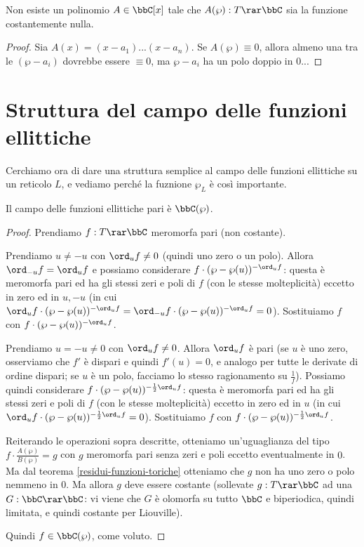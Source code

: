 \begin{teorema}
Non esiste un polinomio $A\in\bbC[x]$ tale che $A(\wp):T\rar\bbC$ sia la funzione costantemente nulla.
\end{teorema}
\begin{proof}
Sia $A(x)=(x-a_1)...(x-a_n)$. Se $A(\wp)\equiv0$, allora almeno una tra le $(\wp-a_i)$ dovrebbe essere $\equiv0$, ma $\wp-a_i$ ha un polo doppio in $0$...
\end{proof}


\section{Struttura del campo delle funzioni ellittiche}
Cerchiamo ora di dare una struttura semplice al campo delle funzioni ellittiche su un reticolo $L$, e vediamo perché la fuznione $\wp_L$ è così importante.

\begin{teorema}
Il campo delle funzioni ellittiche pari è $\bbC(\wp)$.
\end{teorema}
\begin{proof}
Prendiamo $f:T\rar\bbC$ meromorfa pari (non costante).

Prendiamo $u\not=-u$ con $\ord_uf\not=0$ (quindi uno zero o un polo). Allora $\ord_{-u}f=\ord_uf$ e possiamo considerare $f\cdot(\wp-\wp(u))^{-\ord_uf}$:
questa è meromorfa pari ed ha gli stessi zeri e poli di $f$ (con le stesse molteplicità) eccetto
in zero ed in $u,-u$ (in cui $\ord_uf\cdot(\wp-\wp(u))^{-\ord_uf}=\ord_{-u}f\cdot(\wp-\wp(u))^{-\ord_uf}=0$).
Sostituiamo $f$ con $f\cdot(\wp-\wp(u))^{-\ord_uf}$.

Prendiamo $u=-u\not=0$ con $\ord_uf\not=0$. Allora $\ord_uf$ è pari (se $u$ è uno zero, osserviamo che $f'$ è dispari e quindi $f'(u)=0$, e analogo per tutte le derivate di ordine dispari;
se $u$ è un polo, facciamo lo stesso ragionamento su $\frac{1}{f}$). Possiamo quindi considerare $f\cdot(\wp-\wp(u))^{-\frac{1}{2}\ord_uf}$:
questa è meromorfa pari ed ha gli stessi zeri e poli di $f$ (con le stesse molteplicità) eccetto in zero ed in $u$ (in cui $\ord_uf\cdot(\wp-\wp(u))^{-\frac{1}{2}\ord_uf}=0$).
Sostituiamo $f$ con $f\cdot(\wp-\wp(u))^{-\frac{1}{2}\ord_uf}$.

Reiterando le operazioni sopra descritte, otteniamo un'uguaglianza del tipo $f\cdot\frac{A(\wp)}{B(\wp)}=g$ con $g$ meromorfa pari senza zeri e poli eccetto eventualmente in $0$.
Ma dal teorema \ref{residui-funzioni-toriche} otteniamo che $g$ non ha uno zero o polo nemmeno in $0$. Ma allora $g$ deve essere costante
(sollevate $g:T\rar\bbC$ ad una $G:\bbC\rar\bbC$: vi viene che $G$ è olomorfa su tutto $\bbC$ e biperiodica, quindi limitata, e quindi costante per Liouville).

Quindi $f\in\bbC(\wp)$, come voluto.
\end{proof}

